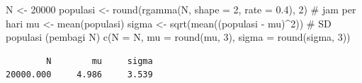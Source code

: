 \documentclass[
  indonesian,
  letterpaper,
]{book}
\newenvironment{Shaded}{\begin{snugshade}}{\end{snugshade}}
\newcommand{\AttributeTok}[1]{\textcolor[rgb]{0.40,0.45,0.13}{#1}}
\newcommand{\CommentTok}[1]{\textcolor[rgb]{0.37,0.37,0.37}{#1}}
\newcommand{\DecValTok}[1]{\textcolor[rgb]{0.68,0.00,0.00}{#1}}
\newcommand{\FloatTok}[1]{\textcolor[rgb]{0.68,0.00,0.00}{#1}}
\newcommand{\FunctionTok}[1]{\textcolor[rgb]{0.28,0.35,0.67}{#1}}
\newcommand{\NormalTok}[1]{\textcolor[rgb]{0.00,0.23,0.31}{#1}}
\newcommand{\OtherTok}[1]{\textcolor[rgb]{0.00,0.23,0.31}{#1}}
\newcommand{\SpecialCharTok}[1]{\textcolor[rgb]{0.37,0.37,0.37}{#1}}
\begin{document}
\begin{Shaded}
\begin{Highlighting}[]
\NormalTok{N }\OtherTok{\textless{}{-}} \DecValTok{20000}
\NormalTok{populasi }\OtherTok{\textless{}{-}} \FunctionTok{round}\NormalTok{(}\FunctionTok{rgamma}\NormalTok{(N, }\AttributeTok{shape =} \DecValTok{2}\NormalTok{, }\AttributeTok{rate =} \FloatTok{0.4}\NormalTok{), }\DecValTok{2}\NormalTok{) }\CommentTok{\# jam per hari}
\NormalTok{mu }\OtherTok{\textless{}{-}} \FunctionTok{mean}\NormalTok{(populasi)}
\NormalTok{sigma }\OtherTok{\textless{}{-}} \FunctionTok{sqrt}\NormalTok{(}\FunctionTok{mean}\NormalTok{((populasi }\SpecialCharTok{{-}}\NormalTok{ mu)}\SpecialCharTok{\^{}}\DecValTok{2}\NormalTok{)) }\CommentTok{\# SD populasi (pembagi N)}
\FunctionTok{c}\NormalTok{(}\AttributeTok{N =}\NormalTok{ N, }\AttributeTok{mu =} \FunctionTok{round}\NormalTok{(mu, }\DecValTok{3}\NormalTok{), }\AttributeTok{sigma =} \FunctionTok{round}\NormalTok{(sigma, }\DecValTok{3}\NormalTok{))}
\end{Highlighting}
\end{Shaded}

\begin{verbatim}
        N        mu     sigma 
20000.000     4.986     3.539 
\end{verbatim}
\end{document}
